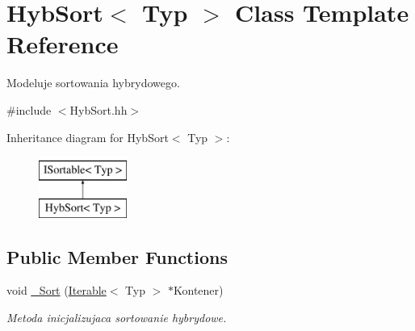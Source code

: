 \hypertarget{class_hyb_sort}{\section{Hyb\-Sort$<$ Typ $>$ Class Template Reference}
\label{class_hyb_sort}
}


Modeluje sortowania hybrydowego.  




{\ttfamily \#include $<$Hyb\-Sort.\-hh$>$}

Inheritance diagram for Hyb\-Sort$<$ Typ $>$\-:\begin{figure}[H]
\begin{center}
\leavevmode
\includegraphics[height=2.000000cm]{class_hyb_sort}
\end{center}
\end{figure}
\subsection*{Public Member Functions}
\begin{DoxyCompactItemize}
\item 
void \hyperlink{class_hyb_sort_af12772bd67fad3bed145474a48b4c8b3}{\-\_\-\-Sort} (\hyperlink{class_iterable}{Iterable}$<$ Typ $>$ $\ast$Kontener)
\begin{DoxyCompactList}\small\item\em Metoda inicjalizujaca sortowanie hybrydowe. \end{DoxyCompactList}\end{DoxyCompactItemize}
